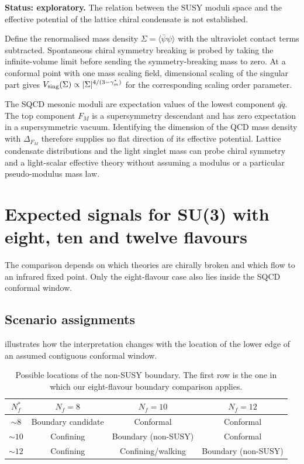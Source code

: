 \documentclass[11pt,a4paper]{article}
\theoremstyle{plain}
\theoremstyle{definition}
\theoremstyle{remark}
\newcommand{\Nf}{N_{\!f}}
\newcommand{\Nfstar}{\Nf^*}
\begin{document}
\textbf{Status: exploratory.}  The relation between the SUSY moduli
space and the effective potential of the lattice chiral condensate is
not established.

Define the renormalised mass density $\Sigma=\langle\bar\psi\psi\rangle$
with the ultraviolet contact terms subtracted.  Spontaneous chiral
symmetry breaking is probed by taking the infinite-volume limit before
sending the symmetry-breaking mass to zero.  At a conformal point with
one mass scaling field, dimensional scaling of the singular part gives
$V_{\rm sing}(\Sigma)\propto|\Sigma|^{4/(3-\gamma_m^*)}$ for the
corresponding scaling order parameter.

The SQCD mesonic moduli are expectation values of the lowest
component $q\tilde q$.  The top component $F_M$ is a supersymmetry
descendant and has zero expectation in a supersymmetric vacuum.
Identifying the dimension of the QCD mass density with $\Delta_{F_M}$
therefore supplies no flat direction of its effective potential.
Lattice condensate distributions and the light singlet mass can probe
chiral symmetry and a light-scalar effective theory without assuming a
modulus or a particular pseudo-modulus mass law.

\section{Expected signals for SU(3) with eight, ten and twelve flavours}
\label{sec:predictions}

The comparison depends on which theories are chirally broken and
which flow to an infrared fixed point.  Only the eight-flavour case
also lies inside the SQCD conformal window.

\subsection{Scenario assignments}

 illustrates how the interpretation changes with
the location of the lower edge of an assumed contiguous conformal window.

\begin{table}[ht]
\centering
\renewcommand{\arraystretch}{1.3}
\caption{Possible locations of the non-SUSY boundary.  The first row
  is the one in which our eight-flavour boundary comparison applies.}
\label{tab:scenarios}
\begin{tabular}{@{} c c c c @{}}
\toprule
$\Nfstar$ & $\Nf = 8$ & $\Nf = 10$ & $\Nf = 12$ \\
\midrule
$\sim 8$  & Boundary candidate & Conformal & Conformal \\
$\sim 10$ & Confining & Boundary (non-SUSY) & Conformal \\
$\sim 12$ & Confining & Confining/walking & Boundary (non-SUSY) \\
\bottomrule
\end{tabular}
\end{table}
\end{document}
